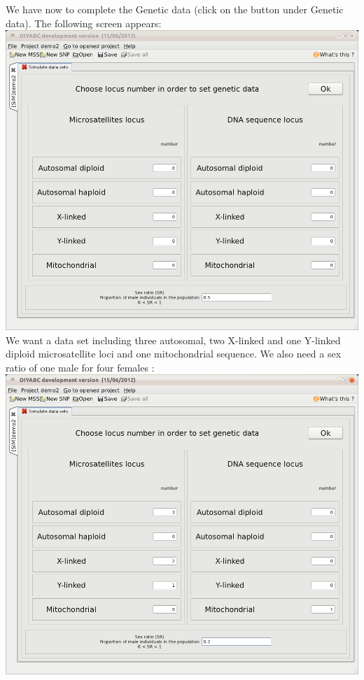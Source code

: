 We have now to complete the Genetic data (click on the 
button under \textsf{Genetic data}). The following screen appears:\\


\includegraphics[scale=0.33]{gui_pictures/Capture-DIYABC-71} \\


We want a data set including three autosomal, two X-linked and one
Y-linked diploid microsatellite loci and one mitochondrial sequence.
We also need a sex ratio of one male for four females :\\


\includegraphics[scale=0.33]{gui_pictures/Capture-DIYABC-72} \\


